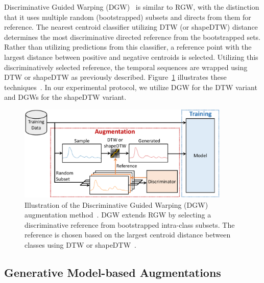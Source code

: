 Discriminative Guided Warping (DGW)~\cite{iwana2020timeseriesdataaugmentation} is similar to RGW, with the distinction that it uses multiple random (bootstrapped) subsets and directs from them for reference. The nearest centroid classifier utilizing DTW (or shapeDTW) distance determines the most discriminative directed reference from the bootstrapped sets. Rather than utilizing predictions from this classifier, a reference point with the largest distance between positive and negative centroids is selected. Utilizing this discriminatively selected reference, the temporal sequences are wrapped using  DTW or shapeDTW as previously described. Figure~\ref{fig:dgw} illustrates these techniques~\cite{iwana2020timeseriesdataaugmentation, 10.1371/journal.pone.0254841, ZHAO2018171}. In our experimental protocol, we utilize DGW for the DTW variant and DGWs for the shapeDTW variant.


\begin{figure}[h!]
    \centering
    \includegraphics[page=1, width=0.9\textwidth]{./images/diagram_disc.pdf}
\caption{Illustration of the Discriminative Guided Warping (DGW) augmentation method~\cite{iwana2020timeseriesdataaugmentation}. DGW extends RGW by selecting a discriminative reference from bootstrapped intra-class subsets. The reference is chosen based on the largest centroid distance between classes using DTW or shapeDTW~\cite{ZHAO2018171}.}
    \label{fig:dgw}
\end{figure}




\subsection{Generative Model-based Augmentations} \label{section:gan}



